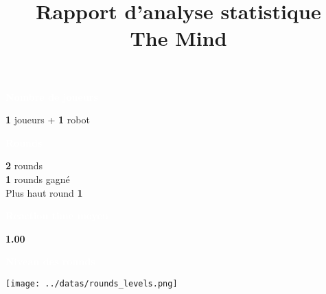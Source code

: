 \documentclass[a4paper,11pt,landscape]{article}
\title{\vspace{-1cm}\Huge \textbf{Rapport d'analyse statistique} \\ \Large The Mind\vspace{-1cm}}
\date{}
\begin{document}
\color{white}
\maketitle
\begin{multicols}{2} %
    \noindent
    \begin{tcolorbox}[colback=ora2,colframe=ora2]
        \begin{tcolorbox}[colback=ora1,colframe=ora1]
            \centering \textcolor{white}{\textbf{Nombre de joueurs}}
        \end{tcolorbox}
    \centering \textbf{
1
    } joueurs + \textbf{
    1
    } robot

    \begin{tcolorbox}[colback=ora1,colframe=ora1]
        \centering \textcolor{white}{\textbf{Rounds}}
    \end{tcolorbox}
        \centering \textbf{
2
        } rounds \\
        \centering \textbf{
1
        } rounds gagné \\
        \centering Plus haut round \textbf{
1
        }

    \begin{tcolorbox}[colback=ora1,colframe=ora1]
        \centering \textcolor{white}{\textbf{Reaction time moyen}}
    \end{tcolorbox}
     \centering \textbf{
1.00
        }

    \end{tcolorbox}

    \vfill

    \noindent
    \begin{tcolorbox}[colback=ora2,colframe=ora2]
        \begin{tcolorbox}[colback=ora1,colframe=ora1]
            \centering \textcolor{white}{\textbf{Niveau des rounds}}
        \end{tcolorbox}
            \centering \texttt{[image: ../datas/rounds\_levels.png]}


    \end{tcolorbox}
    \vfill
\end{multicols}
\end{document}
